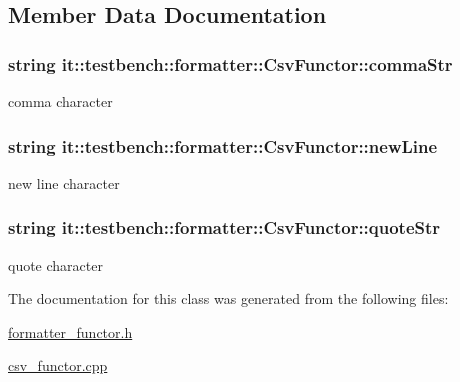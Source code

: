 \subsection{Member Data Documentation}
\hypertarget{classit_1_1testbench_1_1formatter_1_1CsvFunctor_a8e156444be39e0d435e9d7c69dea055a}{
\subsubsection[{comma\-Str}]{\setlength{\rightskip}{0pt plus 5cm}string it\-::testbench\-::formatter\-::\-Csv\-Functor\-::comma\-Str\hspace{0.3cm}{\ttfamily [private]}}}\label{d0/d12/classit_1_1testbench_1_1formatter_1_1CsvFunctor_a8e156444be39e0d435e9d7c69dea055a}
comma character \hypertarget{classit_1_1testbench_1_1formatter_1_1CsvFunctor_adfaa850658fda83deaf3d2c0040ce0ac}{
\subsubsection[{new\-Line}]{\setlength{\rightskip}{0pt plus 5cm}string it\-::testbench\-::formatter\-::\-Csv\-Functor\-::new\-Line\hspace{0.3cm}{\ttfamily [private]}}}\label{d0/d12/classit_1_1testbench_1_1formatter_1_1CsvFunctor_adfaa850658fda83deaf3d2c0040ce0ac}
new line character \hypertarget{classit_1_1testbench_1_1formatter_1_1CsvFunctor_af963baf38dee72fb672f7a23899af0be}{
\subsubsection[{quote\-Str}]{\setlength{\rightskip}{0pt plus 5cm}string it\-::testbench\-::formatter\-::\-Csv\-Functor\-::quote\-Str\hspace{0.3cm}{\ttfamily [private]}}}\label{d0/d12/classit_1_1testbench_1_1formatter_1_1CsvFunctor_af963baf38dee72fb672f7a23899af0be}
quote character 

The documentation for this class was generated from the following files\-:\begin{DoxyCompactItemize}
\item 
\hyperlink{formatter__functor_8h}{formatter\-\_\-functor.\-h}\item 
\hyperlink{csv__functor_8cpp}{csv\-\_\-functor.\-cpp}\end{DoxyCompactItemize}
